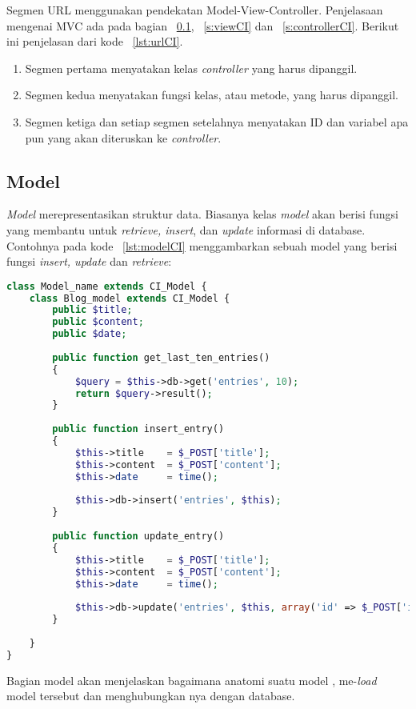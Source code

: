 \noindent Segmen URL menggunakan pendekatan Model-View-Controller. Penjelasaan mengenai MVC ada pada bagian ~\ref{s:modelCI}, ~\ref{s:viewCI} dan ~\ref{s:controllerCI}. Berikut ini penjelasan dari kode ~\ref{lst:urlCI}.
\begin{enumerate}
	\item Segmen pertama menyatakan kelas \textit{controller} yang harus dipanggil.
	\item Segmen kedua menyatakan fungsi kelas, atau metode, yang harus dipanggil.
	\item Segmen ketiga dan setiap segmen setelahnya menyatakan ID dan variabel apa pun yang akan diteruskan ke \textit{controller}.
\end{enumerate}

\subsection{Model}
\label{s:modelCI}
\textit{Model} merepresentasikan struktur data. Biasanya kelas \textit {model} akan berisi fungsi yang membantu untuk \textit{retrieve, insert}, dan \textit{update} informasi di database. Contohnya pada kode ~\ref{lst:modelCI} menggambarkan sebuah model yang berisi fungsi \textit{insert, update} dan \textit{retrieve}:

\begin{lstlisting}[style=customphp, language=PHP, basicstyle=\ttfamily, frame=single, columns=fullflexible, keepspaces=true, breaklines=true, showstringspaces=false, label={lst:modelCI}, caption=Struktur model pada codeIgniter.]  
class Model_name extends CI_Model {
	class Blog_model extends CI_Model {	
		public $title;
		public $content;
		public $date;
		
		public function get_last_ten_entries()
		{
			$query = $this->db->get('entries', 10);
			return $query->result();
		}
		
		public function insert_entry()
		{
			$this->title    = $_POST['title']; 
			$this->content  = $_POST['content'];
			$this->date     = time();
			
			$this->db->insert('entries', $this);
		}
		
		public function update_entry()
		{
			$this->title    = $_POST['title'];
			$this->content  = $_POST['content'];
			$this->date     = time();
			
			$this->db->update('entries', $this, array('id' => $_POST['id']));
		}
	
	}
}
\end{lstlisting}
Bagian model akan menjelaskan bagaimana anatomi suatu model , me-\textit{load} model tersebut  dan menghubungkan nya dengan database.

